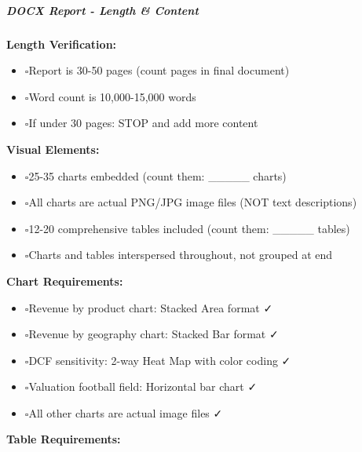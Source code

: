 \documentclass[11pt]{article}
\newcommand{\UncheckedBox}{$\square$}
\begin{document}
\subparagraph{DOCX Report - Length \& Content}\mbox{}\par

\textbf{Length Verification:}

\begin{itemize}[leftmargin=*,itemsep=2pt,topsep=2pt]
\item {} \UncheckedBox Report is 30-50 pages (count pages in final document)
\item {} \UncheckedBox Word count is 10,000-15,000 words
\item {} \UncheckedBox If under 30 pages: STOP and add more content
\end{itemize}

\textbf{Visual Elements:}

\begin{itemize}[leftmargin=*,itemsep=2pt,topsep=2pt]
\item {} \UncheckedBox 25-35 charts embedded (count them: \_\allowbreak{}\_\allowbreak{}\_\allowbreak{}\_\allowbreak{}\_\allowbreak{} charts)
\item {} \UncheckedBox All charts are actual PNG/JPG image files (NOT text descriptions)
\item {} \UncheckedBox 12-20 comprehensive tables included (count them: \_\allowbreak{}\_\allowbreak{}\_\allowbreak{}\_\allowbreak{}\_\allowbreak{} tables)
\item {} \UncheckedBox Charts and tables interspersed throughout, not grouped at end
\end{itemize}

\textbf{Chart Requirements:}

\begin{itemize}[leftmargin=*,itemsep=2pt,topsep=2pt]
\item {} \UncheckedBox Revenue by product chart: Stacked Area format ✓
\item {} \UncheckedBox Revenue by geography chart: Stacked Bar format ✓
\item {} \UncheckedBox DCF sensitivity: 2-way Heat Map with color coding ✓
\item {} \UncheckedBox Valuation football field: Horizontal bar chart ✓
\item {} \UncheckedBox All other charts are actual image files ✓
\end{itemize}

\textbf{Table Requirements:}
\end{document}
